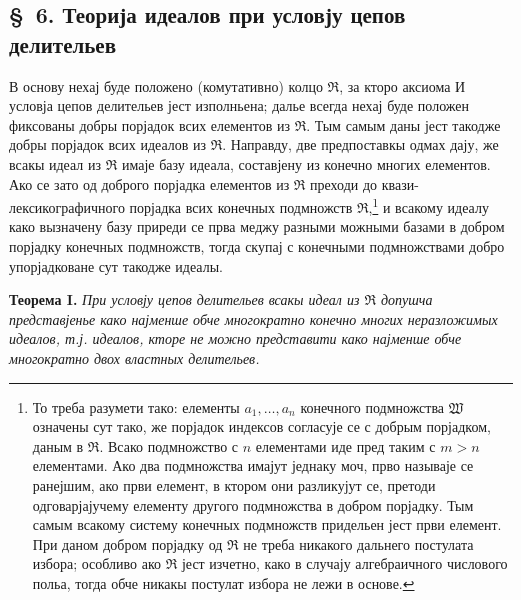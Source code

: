 \documentclass[11pt]{article}
\providecommand{\mR}{\mathfrak{R}}
\begin{document}
\setcounter{footnote}{25}

\subsection*{\S~6. Теорија идеалов при условју цепов делительев}

В основу нехај буде положено (комутативно) колцо $\mR$, за кторо аксиома И условја цепов делительев јест изполньена; далье всегда нехај буде положен фиксованы добры порјадок всих елементов из $\mR$. Тым самым даны јест такодже добры порјадок всих идеалов из $\mR$. Направду, две предпоставкы одмах дају, же всакы идеал из $\mR$ имаје базу идеала, составјену из конечно многих елементов. Ако се зато од доброго порјадка елементов из $\mR$ преходи до квази-лексикографичного порјадка всих конечных подмножств $\mR$,\footnote{То треба разумети тако: елементы $a_1,\ldots,a_n$ конечного подмножства $\mathfrak W$ означены сут тако, же порјадок индексов согласује се с добрым порјадком, даным в $\mR$. Всако подмножство с $n$ елементами иде пред таким с $m>n$ елементами. Ако два подмножства имајут једнаку моч, прво называје се ранејшим, ако први елемент, в ктором они разликујут се, претоди одговарјајучему елементу другого подмножства в добром порјадку. Тым самым всакому систему конечных подмножств придельен јест први елемент. При даном добром порјадку од $\mR$ не треба никакого дальнего постулата избора; особливо ако $\mR$ јест изчетно, како в случају алгебраичного числового польа, тогда обче никакы постулат избора не лежи в основе.} и всакому идеалу како вызначену базу приреди се прва меджу разными можными базами в добром порјадку конечных подмножств, тогда скупај с конечными подмножствами добро упорјадковане сут такодже идеалы.

\textbf{Теорема I.} \emph{При условју цепов делительев всакы идеал из $\mR$ допушча представјенье како најменше обче многократно конечно многих неразложимых идеалов, т.ј. идеалов, кторе не можно представити како најменше обче многократно двох властных делительев.}
\end{document}
